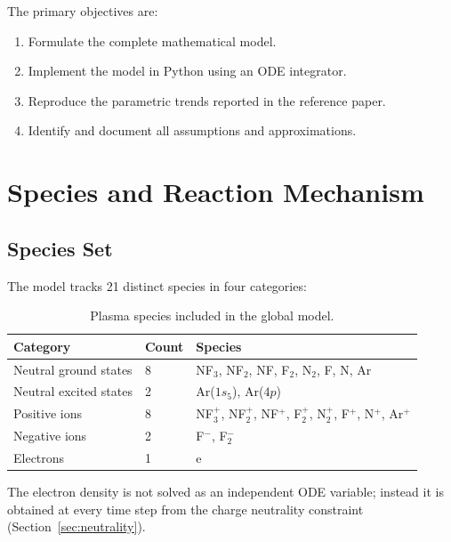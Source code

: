 \documentclass[11pt,a4paper]{article}
\begin{document}
The primary objectives are:
\begin{enumerate}[nosep]
  \item Formulate the complete mathematical model.
  \item Implement the model in Python using an ODE integrator.
  \item Reproduce the parametric trends reported in the reference paper.
  \item Identify and document all assumptions and approximations.
\end{enumerate}


\section{Species and Reaction Mechanism}
\label{sec:species}

\subsection{Species Set}

The model tracks 21 distinct species in four categories:

\begin{table}[H]
  \centering
  \caption{Plasma species included in the global model.}
  \label{tab:species}
  \begin{tabular}{lll}
    \toprule
    \textbf{Category} & \textbf{Count} & \textbf{Species} \\
    \midrule
    Neutral ground states & 8 &
      NF$_3$, NF$_2$, NF, F$_2$, N$_2$, F, N, Ar \\
    Neutral excited states & 2 &
      Ar($1s_5$), Ar($4p$) \\
    Positive ions & 8 &
      NF$_3^+$, NF$_2^+$, NF$^+$, F$_2^+$, N$_2^+$, F$^+$, N$^+$, Ar$^+$ \\
    Negative ions & 2 &
      F$^-$, F$_2^-$ \\
    \midrule
    Electrons & 1 & e \\
    \bottomrule
  \end{tabular}
\end{table}

The electron density is not solved as an independent ODE variable; instead it is
obtained at every time step from the charge neutrality constraint (Section~\ref{sec:neutrality}).
\end{document}
